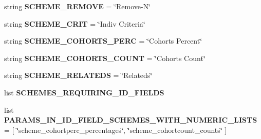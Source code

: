 \begin{DoxyCompactItemize}
\item 
string {\bfseries S\+C\+H\+E\+M\+E\+\_\+\+R\+E\+M\+O\+VE} = \char`\"{}Remove-\/N\char`\"{}\hypertarget{classnegui_1_1pgutilityclasses_1_1NeEstimatorSamplingSchemeParameterManager_a3aac4a2041b0db77d1744915ebdc2364}{}\label{classnegui_1_1pgutilityclasses_1_1NeEstimatorSamplingSchemeParameterManager_a3aac4a2041b0db77d1744915ebdc2364}

\item 
string {\bfseries S\+C\+H\+E\+M\+E\+\_\+\+C\+R\+IT} = \char`\"{}Indiv Criteria\char`\"{}\hypertarget{classnegui_1_1pgutilityclasses_1_1NeEstimatorSamplingSchemeParameterManager_aa898f7e3d58ccc138c60cc75169c64d9}{}\label{classnegui_1_1pgutilityclasses_1_1NeEstimatorSamplingSchemeParameterManager_aa898f7e3d58ccc138c60cc75169c64d9}

\item 
string {\bfseries S\+C\+H\+E\+M\+E\+\_\+\+C\+O\+H\+O\+R\+T\+S\+\_\+\+P\+E\+RC} = \char`\"{}Cohorts Percent\char`\"{}\hypertarget{classnegui_1_1pgutilityclasses_1_1NeEstimatorSamplingSchemeParameterManager_a0df4d940b50ef88af7984637e3fe03b0}{}\label{classnegui_1_1pgutilityclasses_1_1NeEstimatorSamplingSchemeParameterManager_a0df4d940b50ef88af7984637e3fe03b0}

\item 
string {\bfseries S\+C\+H\+E\+M\+E\+\_\+\+C\+O\+H\+O\+R\+T\+S\+\_\+\+C\+O\+U\+NT} = \char`\"{}Cohorts Count\char`\"{}\hypertarget{classnegui_1_1pgutilityclasses_1_1NeEstimatorSamplingSchemeParameterManager_a33cbf2d287843cf339d747ffcca4ac57}{}\label{classnegui_1_1pgutilityclasses_1_1NeEstimatorSamplingSchemeParameterManager_a33cbf2d287843cf339d747ffcca4ac57}

\item 
string {\bfseries S\+C\+H\+E\+M\+E\+\_\+\+R\+E\+L\+A\+T\+E\+DS} = \char`\"{}Relateds\char`\"{}\hypertarget{classnegui_1_1pgutilityclasses_1_1NeEstimatorSamplingSchemeParameterManager_abb1ebfe7d98bd7ffc7f08e79e4013984}{}\label{classnegui_1_1pgutilityclasses_1_1NeEstimatorSamplingSchemeParameterManager_abb1ebfe7d98bd7ffc7f08e79e4013984}

\item 
list {\bfseries S\+C\+H\+E\+M\+E\+S\+\_\+\+R\+E\+Q\+U\+I\+R\+I\+N\+G\+\_\+\+I\+D\+\_\+\+F\+I\+E\+L\+DS}
\item 
list {\bfseries P\+A\+R\+A\+M\+S\+\_\+\+I\+N\+\_\+\+I\+D\+\_\+\+F\+I\+E\+L\+D\+\_\+\+S\+C\+H\+E\+M\+E\+S\+\_\+\+W\+I\+T\+H\+\_\+\+N\+U\+M\+E\+R\+I\+C\+\_\+\+L\+I\+S\+TS} = \mbox{[} \char`\"{}scheme\+\_\+cohortperc\+\_\+percentages\char`\"{}, \char`\"{}scheme\+\_\+cohortcount\+\_\+counts\char`\"{} \mbox{]}\hypertarget{classnegui_1_1pgutilityclasses_1_1NeEstimatorSamplingSchemeParameterManager_a8b45891995f878a04db3b45036d3f2ec}{}\label{classnegui_1_1pgutilityclasses_1_1NeEstimatorSamplingSchemeParameterManager_a8b45891995f878a04db3b45036d3f2ec}


\end{DoxyCompactItemize}
